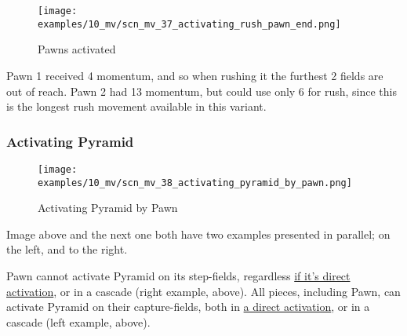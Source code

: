 \clearpage %

\vspace*{-2.1\baselineskip}
\noindent
\begin{figure}[!h]
\texttt{[image: examples/10\_mv/scn\_mv\_37\_activating\_rush\_pawn\_end.png]}
\caption{Pawns activated}
\label{fig:scn_mv_37_activating_rush_pawn_end}
\end{figure}

Pawn 1 received 4 momentum, and so when rushing it the furthest 2 fields are out
of reach. Pawn 2 had 13 momentum, but could use only 6 for rush, since this is the
longest rush movement available in this variant.

\clearpage %

\subsubsection*{Activating Pyramid}
\label{sec:Miranda's veil/Wave/Cascading Waves/Activating Pyramid}

\vspace*{-1.4\baselineskip}
\noindent
\begin{figure}[!h]
\texttt{[image: examples/10\_mv/scn\_mv\_38\_activating\_pyramid\_by\_pawn.png]}
\vspace*{-1.3\baselineskip}
\caption{Activating Pyramid by Pawn}
\label{fig:scn_mv_38_activating_pyramid_by_pawn}
\end{figure}

\vspace*{-0.3\baselineskip}
Image above and the next one both have two examples presented in parallel; on the left,
and to the right.

Pawn cannot activate Pyramid on its step-fields, regardless
\hyperref[fig:scn_ma_04_pyramid_activation_by_pawn]{if it's direct activation}, or in a cascade
(right example, above). All pieces, including Pawn, can activate Pyramid on their capture-fields,
both in \hyperref[fig:scn_ma_01_pyramid_activation_init]{a direct activation}, or in a cascade
(left example, above).

\clearpage %

